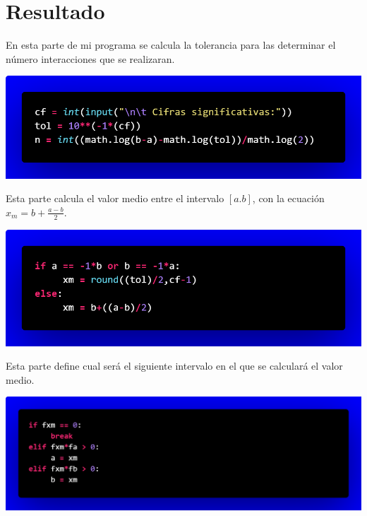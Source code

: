 \documentclass[12pt]{article}
\begin{document}
		\section*{\centering Resultado}\label{sec:Resultado}
			En esta parte de mi programa se calcula la tolerancia para las determinar el número interacciones que se realizaran.
			\begin{center}
				\includegraphics[width=\linewidth]{Figura 1.png} 				
			\end{center}
			Esta parte calcula el valor medio entre el intervalo $ [a.b] $, con la ecuación $ x_m = b+\frac{a-b}{2} $.
			\begin{center}
				\includegraphics[width=\linewidth]{Figura 2.png} 				
			\end{center}
			Esta parte define cual será el siguiente intervalo en el que se calculará el valor medio.
			\begin{center}
				\includegraphics[width=\linewidth]{Figura 3.png} 				
			\end{center}
		
\end{document}

